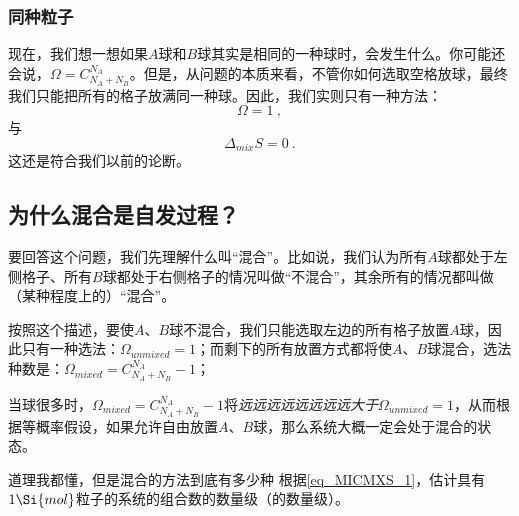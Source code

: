 \subsubsection{同种粒子}
现在，我们想一想如果$A$球和$B$球其实是相同的一种球时，会发生什么。你可能还会说，$\Omega = C^{N_A}_{N_A+N_B}$。但是，从问题的本质来看，不管你如何选取空格放球，最终我们只能把所有的格子放满同一种球。因此，我们实则只有一种方法：
\begin{equation}
\Omega = 1~,
\end{equation}
与
\begin{equation}
\Delta_{mix} S = 0~.
\end{equation}
这还是符合我们以前的论断。

\subsection{为什么混合是自发过程？}
要回答这个问题，我们先理解什么叫“混合”。比如说，我们认为所有$A$球都处于左侧格子、所有$B$球都处于右侧格子的情况叫做“不混合”，其余所有的情况都叫做（某种程度上的）“混合”。

按照这个描述，要使$A$、$B$球不混合，我们只能选取左边的所有格子放置$A$球，因此只有一种选法：$\Omega_{unmixed} = 1$；而剩下的所有放置方式都将使$A$、$B$球混合，选法种数是：$\Omega_{mixed} =  C^{N_A}_{N_A+N_B} - 1$；

当球很多时，$\Omega_{mixed} = C^{N_A}_{N_A+N_B} - 1$将\textsl{远远远远远远远远大于}$\Omega_{unmixed} = 1$，从而根据等概率假设，如果允许自由放置$A$、$B$球，那么系统大概一定会处于混合的状态。

\begin{exercise}{道理我都懂，但是混合的方法到底有多少种}
根据\autoref{eq_MICMXS_1}，估计具有$1 \Si{mol}$粒子的系统的组合数的数量级（的数量级）。
\end{exercise}
